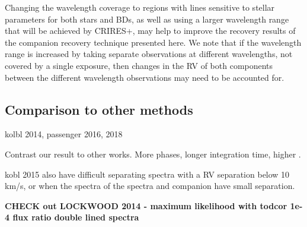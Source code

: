 Changing the wavelength coverage to regions with lines sensitive to stellar parameters for both stars and {BD}s, as well as using a larger wavelength range that will be achieved by {CRIRES+}, may help to improve the recovery results of the companion recovery technique presented here.
We note that if the wavelength range is increased by taking separate observations at different wavelengths, not covered by a single exposure, then changes in the {RV} of both components between the different wavelength observations may need to be accounted for.



\subsection{Comparison to other methods}
kolbl 2014, passenger 2016, 2018

Contrast our result to other works.
More phases, longer integration time, higher {\snr{}}.



kobl 2015 also have difficult separating spectra with a {RV} separation below 10 km/s, or when the spectra of the spectra and companion have small separation.\todo{}


\textbf{
    CHECK out LOCKWOOD 2014 - maximum likelihood with todcor 1e-4 flux ratio double lined spectra}

